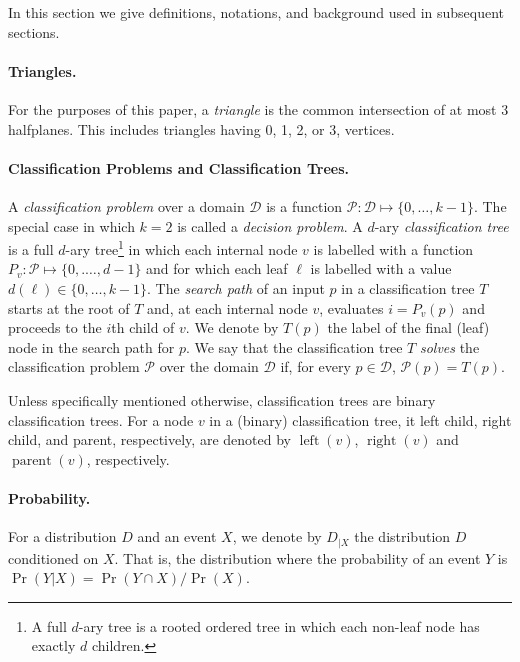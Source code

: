 \documentclass[charterfonts,lotsofwhite]{patmorin}
\DeclareMathOperator{\lft}{left}
\DeclareMathOperator{\rght}{right}
\DeclareMathOperator{\prnt}{parent}
\begin{document}
In this section we give definitions, notations, and background used in
subsequent sections.

\paragraph{Triangles.}  For the purposes of this paper, a
\emph{triangle} is the common intersection of at most 3 halfplanes.
This includes triangles having 0, 1, 2, or 3, vertices.  

\paragraph{Classification Problems and Classification Trees.}

A \emph{classification problem} over a domain $\mathcal{D}$ is a
function $\mathcal{P}:\mathcal{D}\mapsto \{0,\ldots,k-1\}$.  The
special case in which $k=2$ is called a \emph{decision problem}.  A
$d$-ary \emph{classification tree} is a full $d$-ary tree\footnote{A
full $d$-ary tree is a rooted ordered tree in which each non-leaf node
has exactly $d$ children.} in which each internal node $v$ is labelled
with a function $P_v:\mathcal{P}\mapsto\{0,.\ldots,d-1\}$ and for
which each leaf $\ell$ is labelled with a value
$d(\ell)\in\{0,\ldots,k-1\}$. The \emph{search path} of an input $p$
in a classification tree $T$ starts at the root of $T$ and, at each
internal node $v$, evaluates $i=P_v(p)$ and proceeds to the $i$th
child of $v$.  We denote by $T(p)$ the label of the final (leaf) node
in the search path for $p$.  We say that the classification tree $T$
\emph{solves} the classification problem $\mathcal{P}$ over the domain
$\mathcal{D}$ if, for every $p\in \mathcal{D}$, $\mathcal{P}(p)=T(p)$.

Unless specifically mentioned otherwise, classification trees are
binary classification trees.  For a node $v$ in a (binary)
classification tree, it left child, right child, and parent,
respectively, are denoted by $\lft(v)$, $\rght(v)$ and $\prnt(v)$,
respectively.


\paragraph{Probability.}

For a distribution $D$ and an event $X$, we denote by $D_{|X}$ the
distribution $D$ conditioned on $X$.  That is, the distribution where
the probability of an event $Y$ is $\Pr(Y|X)=\Pr(Y\cap X)/\Pr(X)$.
\end{document}
